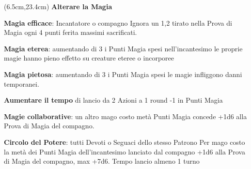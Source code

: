 \documentclass[a4paper,12 pt,openany]{book}
\begin{document}
{\small
\begin{textblock*}{13.5cm}(6.5cm,23.4cm) %
\textbf{Alterare la Magia}

	\textbf{Magia efficace}: Incantatore o compagno Ignora un 1,2 tirato nella Prova di Magia ogni 4 punti ferita massimi sacrificati.

	\textbf{Magia eterea}: aumentando di 3 i Punti Magia spesi nell'incantesimo le proprie magie hanno pieno effetto su creature eteree o incorporee

	\textbf{Magia pietosa}: aumentando di 3 i Punti Magia spesi le magie infliggono danni temporanei.

	\textbf{Aumentare il tempo} di lancio da 2 Azioni a 1 round -1 in Punti Magia

	\textbf{Magie collaborative}: un altro mago costo metà Punti Magia concede +1d6 alla Prova di Magia del compagno.

	\textbf{Circolo del Potere}: tutti Devoti o Seguaci dello stesso Patrono
	Per mago costo la metà dei Punti Magia dell'incantesimo lanciato dal compagno +1d6 alla Prova di Magia del compagno, max +7d6. Tempo lancio almeno 1 turno
\end{textblock*}}

	 	~\newpage
\end{document}
